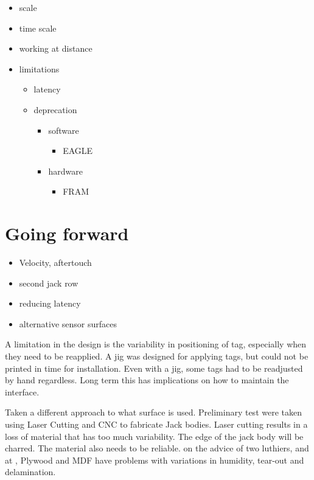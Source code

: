 \begin{itemize}
\item
  scale
\item
  time scale
\item
  working at distance
\item
  limitations

  \begin{itemize}
  \item
    latency
  \item
    deprecation

    \begin{itemize}
    \item
      software

      \begin{itemize}
      \item
        EAGLE
      \end{itemize}
    \item
      hardware

      \begin{itemize}
      \item
        FRAM
      \end{itemize}
    \end{itemize}
  \end{itemize}
\end{itemize}

\section{Going forward}\label{going-forward}

\begin{itemize}
\item
  Velocity, aftertouch
\item
  second jack row
\item
  reducing latency
\item
  alternative sensor surfaces
\end{itemize}

A limitation in the design is the variability in positioning of tag,
especially when they need to be reapplied. A jig was designed for
applying tags, but could not be printed in time for installation. Even
with a jig, some tags had to be readjusted by hand regardless. Long term
this has implications on how to maintain the interface.

Taken a different approach to what surface is used. Preliminary test
were taken using Laser Cutting and CNC to fabricate Jack bodies. Laser
cutting results in a loss of material that has too much variability. The
edge of the jack body will be charred. The material also needs to be
reliable. on the advice of two luthiers,  and  at , Plywood and MDF have problems with
variations in humidity, tear-out and delamination.

